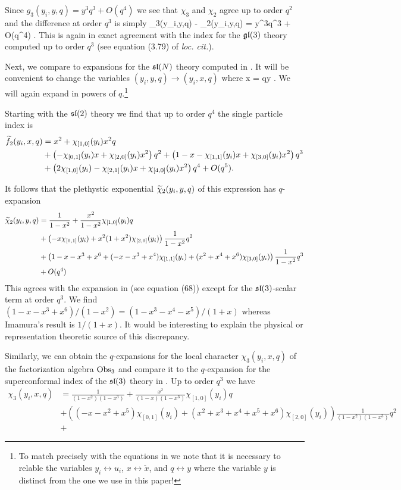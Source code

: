 Since $g_3(y_i,y,q) = y^3 q^3 + O(q^4)$ we see that $\chi_3$ and $\chi_2$ agree up to order $q^2$ and the difference at order $q^3$ is simply
\beqn
\chi_3(y_i,y,q) - \chi_2(y_i,y,q) = y^3q^3 + O(q^4) .
\eeqn
This is again in exact agreement with the index for the $\mathfrak{gl}(3)$ theory computed \cite{Kim:2013nva} up to order $q^3$ (see equation (3.79) of \textit{loc. cit.}). 

\parsec

Next, we compare to expansions for the $\mathfrak{sl}(N)$ theory computed in \cite{Imamura}.
It will be convenient to change the variables $(y_i, y, q) \to (y_i,x,q)$ where 
\beqn
x = qy .
\eeqn 
We will again expand in powers of $q$.\footnote{To match precisely with the equations in \cite{Imamura} we note that it is necessary to relable the variables $y_i \leftrightarrow u_i$, $x \leftrightarrow \check{x}$, and $q \leftrightarrow y$ where the variable $y$ is distinct from the one we use in this paper!}

Starting with the $\mathfrak{sl}(2)$ theory we find that up to order $q^4$ the single particle index is
\begin{align*}
\widetilde f_2 (y_i,x,q) & = x^2 + \chi_{[1,0]}(y_i) x^2 q \\
& + \left(-\chi_{[0,1]}(y_i) x + \chi_{[2,0]}(y_i) x^2 \right) q^2 +  \left(1-x-\chi_{[1,1]}(y_i) x + \chi_{[3,0]}(y_i) x^2 \right) q^3 \\
& + \left(2 \chi_{[1,0]}(y_i) - \chi_{[2,1]}(y_i) x + \chi_{[4,0]}(y_i)x^2 \right)q^4 + O(q^5) .
\end{align*}

It follows that the plethystic exponential $\widetilde \chi_2(y_i,y,q)$ of this expression has $q$-expansion
\begin{align*}
\widetilde \chi_2(y_i,y,q) & = \frac{1}{1-x^2} +  \frac{x^2}{1-x^2} \chi_{[1,0]}(y_i) q \\
& + \left(- x \chi_{[0,1]}(y_i) +  x^2 (1+x^2)\chi_{[2,0]}(y_i)\right) \frac{1}{1-x^2} q^2 \\ 
& + \left( 1 - x - x^3 + x^6 + (-x - x^3 + x^4) \chi_{[1,1]}(y_i)  + (x^2 + x^4 + x^6)\chi_{[3,0]}(y_i)  \right) \frac{1}{1-x^2} q^3 \\
& + O(q^4) 
\end{align*}
This agrees with the expansion in \cite{Imamura} (see equation (68)) except for the $\mathfrak{sl}(3)$-scalar term at order $q^3$. 
We find $(1-x-x^3+x^6) / (1-x^2) = (1-x^3-x^4-x^5) / (1+x)$ whereas Imamura's result is $1 / (1+x)$. 
It would be interesting to explain the physical or representation theoretic source of this discrepancy.

Similarly, we can obtain the $q$-expansions for the local character $\chi_3(y_i,x,q)$ of the factorization algebra $\operatorname{Obs}_3$ and compare it to the $q$-expansion for the superconformal index of the $\mathfrak{sl}(3)$ theory in \cite{Imamura}. 
Up to order $q^3$ we have
\begin{align*}
\chi_3(y_i,x,q) & = \frac{1}{(1-x^2)(1-x^3)} + \frac{x^2}{(1-x)(1-x^3)} \chi_{[1,0]}(y_i) q \\
& + \left((-x -x^2 + x^5)\chi_{[0,1]}(y_i) + (x^2 + x^3 + x^4 + x^5+ x^6) \chi_{[2,0]}(y_i) \right) \frac{1}{(1-x^2)(1-x^3)} q^2 \\
& + 
\end{align*}
